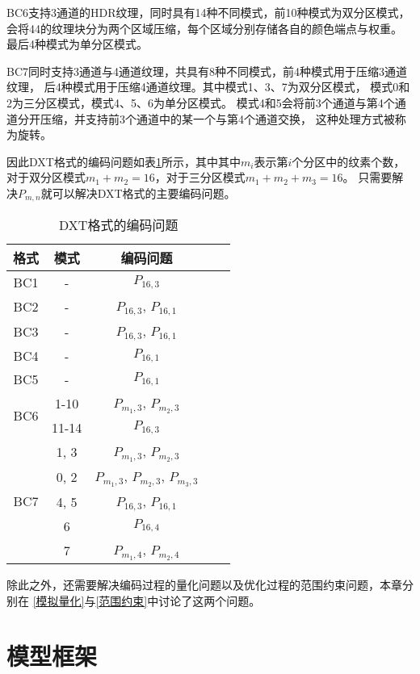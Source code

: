 BC6支持3通道的HDR纹理，同时具有14种不同模式，前10种模式为双分区模式，
会将4\times4的纹理块分为两个区域压缩，每个区域分别存储各自的颜色端点与权重。
最后4种模式为单分区模式。

BC7同时支持3通道与4通道纹理，共具有8种不同模式，前4种模式用于压缩3通道纹理，
后4种模式用于压缩4通道纹理。其中模式1、3、7为双分区模式，
模式0和2为三分区模式，模式4、5、6为单分区模式。
模式4和5会将前3个通道与第4个通道分开压缩，并支持前3个通道中的某一个与第4个通道交换，
这种处理方式被称为旋转。

因此DXT格式的编码问题如表\ref{tab:DXTEncodeproblem}所示，其中其中$m_i$表示第$i$个分区中的纹素个数，
对于双分区模式$m_1+m_2=16$，对于三分区模式$m_1+m_2+m_3=16$。
只需要解决$P_{m,n}$就可以解决DXT格式的主要编码问题。
\begin{table}[htbp]
    \centering
    \caption{DXT格式的编码问题}
    \label{tab:DXTEncodeproblem}        
    \begin{tabular}{ccccc}
    \toprule
    格式    & 模式 & 编码问题 \\
    \midrule
    BC1   & -  & $P_{16,3}$               \\
    BC2   & - & $P_{16,3}$, $P_{16,1}$    \\
    BC3   & - & $P_{16,3}$, $P_{16,1}$    \\
    BC4   & - & $P_{16,1}$                  \\
    BC5   & - & $P_{16,1}$     \\
    \midrule
    \multirow{2}{*}{BC6}   & 1-10&   $P_{m_1,3}$, $P_{m_2,3}$     \\
       &11-14&  $P_{16,3}$     \\
    \midrule
    \multirow{5}{*}{BC7}   & 1, 3&   $P_{m_1,3}$, $P_{m_2,3}$     \\
        &0, 2&  $P_{m_1,3}$, $P_{m_2,3}$, $P_{m_3,3}$     \\  
        &4, 5&  $P_{16,3}$, $P_{16,1}$     \\    
        &6&  $P_{16,4}$     \\  
        &7&  $P_{m_1,4}$, $P_{m_2,4}$     \\
    \bottomrule
    \end{tabular}
\end{table}

除此之外，还需要解决编码过程的量化问题以及优化过程的范围约束问题，本章分别在
\ref{模拟量化}与\ref{范围约束}中讨论了这两个问题。


\section{模型框架}

